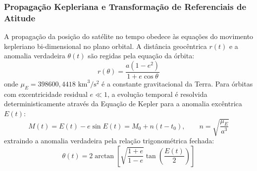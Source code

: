 \subsubsection{Propagação Kepleriana e Transformação de Referenciais de Atitude}

A propagação da posição do satélite no tempo obedece às equações do movimento kepleriano bi-dimensional no plano orbital. A distância geocêntrica $r(t)$ e a anomalia verdadeira $\theta(t)$ são regidas pela equação da órbita:
\begin{equation}
    r(\theta) = \frac{a (1 - e^2)}{1 + e \cos \theta}
    \label{eq:orbita_raio}
\end{equation}
onde $\mu_E = 398600{,}4418\text{ km}^3/\text{s}^2$ é a constante gravitacional da Terra. Para órbitas com excentricidade residual $e \ll 1$, a evolução temporal é resolvida deterministicamente através da Equação de Kepler para a anomalia excêntrica $E(t)$:
\begin{equation}
    M(t) = E(t) - e \sin E(t) = M_0 + n(t - t_0), \qquad n = \sqrt{\frac{\mu_E}{a^3}}
    \label{eq:kepler_anomalia}
\end{equation}
extraindo a anomalia verdadeira pela relação trigonométrica fechada:
\begin{equation}
    \theta(t) = 2 \arctan\left[ \sqrt{\frac{1 + e}{1 - e}} \tan\left(\frac{E(t)}{2}\right) \right]
    \label{eq:anomalia_verdadeira}
\end{equation}

